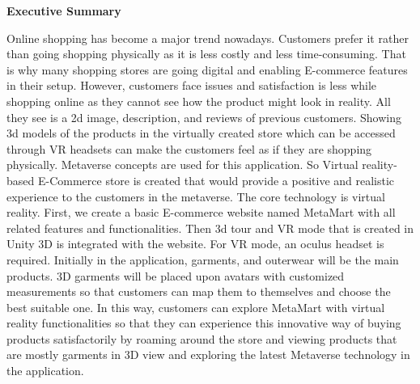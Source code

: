 \documentclass[a4paper, 11pt, oneside]{thesis}  %
\begin{document}
\clearpage 
\thispagestyle{plain}
\begin{center}
{\huge \textbf{Executive Summary} \par}
\end{center}
Online shopping has become a major trend nowadays. Customers prefer it rather than going shopping physically as it is less costly and less time-consuming. That is why many shopping stores are going digital and enabling E-commerce features in their setup. However, customers face issues and satisfaction is less while shopping online as they cannot see how the product might look in reality. All they see is a 2d image, description, and reviews of previous customers. Showing 3d models of the products in the virtually created store which can be accessed through VR headsets can make the customers feel as if they are shopping physically. Metaverse concepts are used for this application. So Virtual reality-based E-Commerce store is created that would provide a positive and realistic experience to the customers in the metaverse. The core technology is virtual reality.
First, we create a basic E-commerce website named MetaMart with all related features and functionalities. Then 3d tour and VR mode that is created in Unity 3D is integrated with the website. For VR mode, an oculus headset is required. Initially in the application, garments, and outerwear will be the main products. 3D garments will be placed upon avatars with customized measurements so that customers can map them to themselves and choose the best suitable one. In this way, customers can explore MetaMart with virtual reality functionalities so that they can experience this innovative way of buying products satisfactorily by roaming around the store and viewing products that are mostly garments in 3D view and exploring the latest Metaverse technology in the application.
\end{document}
